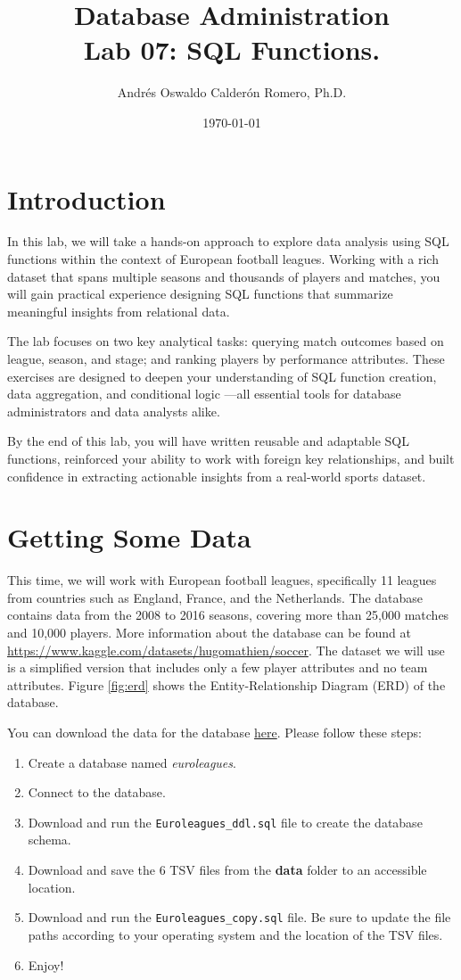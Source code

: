 \documentclass{article}
\title{Database Administration \\ Lab 07: SQL Functions.}
\author{Andrés Oswaldo Calderón Romero, Ph.D.}
\date{\today}
\begin{document}
\maketitle

\section{Introduction}
In this lab, we will take a hands-on approach to explore data analysis using SQL functions within the context of European football leagues. Working with a rich dataset that spans multiple seasons and thousands of players and matches, you will gain practical experience designing SQL functions that summarize meaningful insights from relational data.

The lab focuses on two key analytical tasks: querying match outcomes based on league, season, and stage; and ranking players by performance attributes. These exercises are designed to deepen your understanding of SQL function creation, data aggregation, and conditional logic ---all essential tools for database administrators and data analysts alike.

By the end of this lab, you will have written reusable and adaptable SQL functions, reinforced your ability to work with foreign key relationships, and built confidence in extracting actionable insights from a real-world sports dataset.

\section{Getting Some Data}
This time, we will work with European football leagues, specifically 11 leagues from countries such as England, France, and the Netherlands. The database contains data from the 2008 to 2016 seasons, covering more than 25,000 matches and 10,000 players.
More information about the database can be found at \url{https://www.kaggle.com/datasets/hugomathien/soccer}. The dataset we will use is a simplified version that includes only a few player attributes and no team attributes. Figure \ref{fig:erd} shows the Entity-Relationship Diagram (ERD) of the database.

You can download the data for the database \href{https://drive.google.com/drive/folders/12KoKu76ZDpIoDtE78Lc6g6Y2y0zTJJbO?usp=sharing}{here}. Please follow these steps:

\begin{enumerate}
    \item Create a database named \textit{euroleagues}.
    \item Connect to the database.
    \item Download and run the \texttt{Euroleagues\_ddl.sql} file to create the database schema.
    \item Download and save the 6 TSV files from the \textbf{data} folder to an accessible location.
    \item Download and run the \texttt{Euroleagues\_copy.sql} file. Be sure to update the file paths according to your operating system and the location of the TSV files.
    \item Enjoy!
\end{enumerate}
\end{document}
